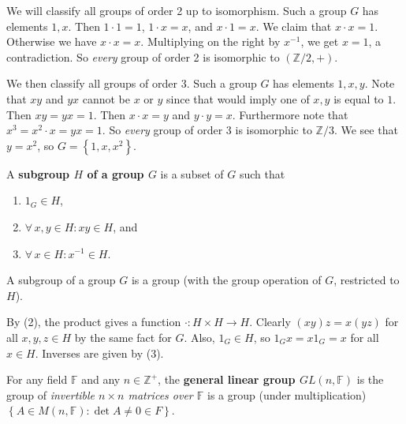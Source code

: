 \documentclass{notes}
\begin{document}
\begin{eg}
  We will classify all groups of order 2 up to isomorphism.
  Such a group $G$ has elements $1, x$.
  Then $1 \cdot 1 = 1$, $1 \cdot x = x$, and $x \cdot 1 = x$.
  We claim that $x \cdot x = 1$.
  Otherwise we have $x \cdot x = x$.
  Multiplying on the right by $x^{-1}$, we get $x = 1$, a contradiction.
  So \textit{every} group of order 2 is isomorphic to $(\mathbb Z / 2, +)$.
\end{eg}

\begin{eg}
  We then classify all groups of order 3.
  Such a group $G$ has elements $1, x, y$.
  Note that $x y$ and $y x$ cannot be $x$ or $y$ since that would imply one of $x, y$ is equal to $1$.
  Then $x y = y x = 1$.
  Then $x \cdot x = y$ and $y \cdot y = x$.
  Furthermore note that $x^3 = x^2 \cdot x = y x = 1$.
  So \textit{every} group of order 3 is isomorphic to $\mathbb Z / 3$.
  We see that $y = x^2$, so $G = \left \{ 1, x, x^2 \right \}$.
\end{eg}

\begin{defn}
  A {\boldmath \bfseries subgroup $H$ of a group $G$} is a subset of $G$ such that 
  \begin{enumerate}
    \item $1_G \in H$, 

    \item $\forall \, x, y \in H: x y \in H$, and 

    \item $\forall \, x \in H: x^{-1} \in H$.
  \end{enumerate}
\end{defn}

\begin{lem}
  A subgroup of a group $G$ is a group (with the group operation of $G$, restricted to $H$).
\end{lem}

\begin{prf}
  By (2), the product gives a function $\cdot \colon H \times H \to H$.
  Clearly $(x y) z = x (y z)$ for all $x, y, z \in H$ by the same fact for $G$.
  Also, $1_G \in H$, so $1_G x = x 1_G = x$ for all $x \in H$.
  Inverses are given by (3).
\end{prf}

\begin{eg}
  For any field $\mathbb F$ and any $n \in \mathbb Z^+$, the {\boldmath \bfseries general linear group $GL(n, \mathbb F)$} is the group of \textit{invertible $n \times n$ matrices over $\mathbb F$} is a group (under multiplication) $\left \{ A \in M(n, \mathbb F) : \det A \neq 0 \in F \right \}$.
\end{eg}
\end{document}
